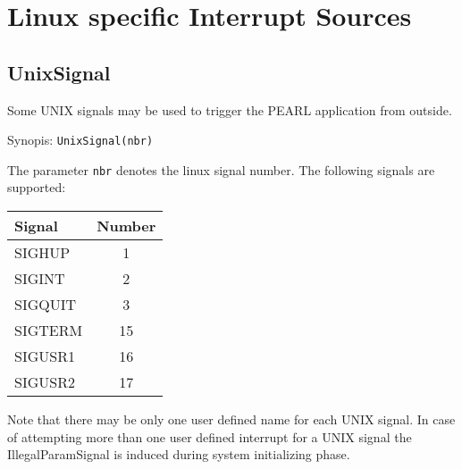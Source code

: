 \section{Linux specific Interrupt Sources}

\subsection{UnixSignal}
Some UNIX signals may be used to trigger the PEARL application from outside.

Synopis: \verb|UnixSignal(nbr)|

The parameter \verb|nbr| denotes the linux signal number.
The following signals are supported:

\begin{tabular}{|l|c|}
\hline
Signal & Number \\
\hline
SIGHUP & 1 \\
SIGINT & 2 \\
SIGQUIT & 3 \\
SIGTERM & 15 \\
SIGUSR1 & 16 \\
SIGUSR2 & 17 \\
\hline
\end{tabular}

Note that there may be only one user defined name for each UNIX signal.
In case of attempting more than one user defined interrupt for 
a UNIX signal the IllegalParamSignal is induced 
during system initializing phase.

